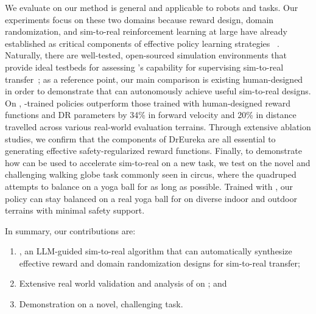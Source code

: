 \documentclass[conference]{IEEEtran}
\begin{document}
 We evaluate \ourmethod on  our method is general and applicable to  robots and tasks. Our experiments focus on these two domains because reward design, domain randomization, and sim-to-real reinforcement learning at large have already established as critical components of effective policy learning strategies ~\citep{rudin2022learning,lee2020learning,kumar2021rma,margolis2022rapid,margolis2023walk,akkaya2019solving,handa2023dextreme,qi2023hand}. Naturally, there are well-tested, open-sourced simulation environments that provide ideal testbeds for assessing \ourmethod's capability for supervising sim-to-real transfer~\citep{rudin2022learning,margolis2023walk,shaw2023leap}; as a reference point, our main comparison is  existing human-designed ~\citep{margolis2022rapid,shaw2023leap} in order to demonstrate that \ourmethod can autonomously achieve useful sim-to-real designs. On , \ourmethod-trained policies outperform those trained with human-designed reward functions and DR parameters by 34\% in forward velocity and 20\% in distance travelled across various real-world evaluation terrains.  Through extensive ablation studies, we confirm that the components of DrEureka are all essential to generating effective safety-regularized reward functions. Finally, to demonstrate how \ourmethod can be used to accelerate sim-to-real on a new task, we test \ourmethod on the novel and challenging walking globe task commonly seen in circus, where the quadruped attempts to balance  on a yoga ball for as long as possible. Trained with \ourmethod, our policy can stay balanced on a real yoga ball for  on diverse indoor and outdoor terrains with minimal safety support.






In summary, our contributions are:
\begin{enumerate}
    \item \ourmethod, an LLM-guided sim-to-real algorithm that can automatically synthesize effective reward and domain randomization designs for sim-to-real transfer; 
    \item Extensive real world validation and analysis of \ourmethod on ; and
    \item Demonstration on a novel, challenging task.
\end{enumerate}
\end{document}
